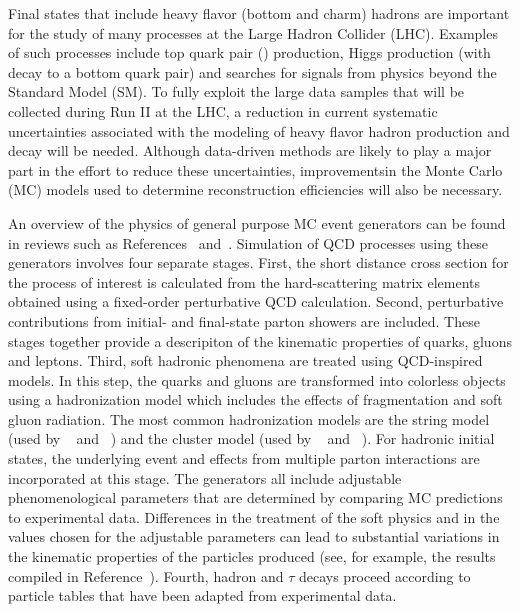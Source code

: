 Final states that include heavy flavor (bottom and charm) hadrons are important for the
study of many processes at the Large Hadron Collider (LHC).  Examples of such processes
include top quark pair (\ttbar) production, Higgs production (with decay to a bottom quark pair)
and searches for signals from physics beyond the Standard Model (SM).  
To fully exploit the large data samples that will be collected during Run II at the LHC,
a reduction in current systematic uncertainties associated with the modeling of
heavy flavor hadron production and decay will be needed.
Although data-driven methods are likely to play a major part in the effort to reduce these
uncertainties, improvementsin the Monte Carlo (MC) models used to determine
reconstruction efficiencies  will also be necessary.

An overview of the physics of general purpose MC event generators can be found in reviews such as References~\cite{Buckley:2011ms} and~\cite{PDGMC}. Simulation of QCD processes using these generators involves four separate stages.  First, the short distance cross section for the process of interest is calculated from the hard-scattering matrix elements obtained using a fixed-order perturbative QCD calculation.    Second, perturbative contributions from initial- and final-state parton showers are included.  These stages together provide a descripiton of the kinematic properties of quarks, gluons and leptons.  Third, soft hadronic phenomena are treated using QCD-inspired models.  In this step, the quarks and gluons are transformed into colorless objects using a hadronization model which includes the effects of fragmentation and soft gluon radiation.  The most common hadronization models are the string model (used by \Pythia~\cite{Sjostrand:2006za} and \PythiaE~\cite{Sjostrand:2007gs}) and the cluster model (used by \Herwig~\cite{Corcella:2002jc} and \Herwigpp~\cite{Bahr:2008pv}).     For hadronic initial states, the underlying event and effects from multiple parton interactions are incorporated at this stage.  The generators all include adjustable phenomenological parameters that are determined by comparing MC predictions to experimental data.  Differences in the treatment of the soft physics and in the values chosen for the adjustable parameters can lead to substantial variations in the kinematic properties of the particles produced (see, for example, the results compiled in Reference~\cite{Karneyeu:2013aha}).  Fourth, hadron and $\tau$ decays proceed according to particle tables that have been adapted from experimental data.




